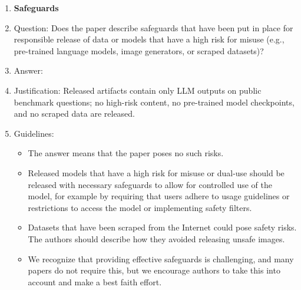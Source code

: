 \documentclass[11pt]{article}
\begin{document}
\begin{enumerate}
\item {\bf Safeguards}
    \item[] Question: Does the paper describe safeguards that have been put in place for responsible release of data or models that have a high risk for misuse (e.g., pre-trained language models, image generators, or scraped datasets)?
    \item[] Answer: \answerNA{}
    \item[] Justification: Released artifacts contain only LLM outputs on public benchmark questions; no high-risk content, no pre-trained model checkpoints, and no scraped data are released.
    \item[] Guidelines:
    \begin{itemize}
        \item The answer \answerNA{} means that the paper poses no such risks.
        \item Released models that have a high risk for misuse or dual-use should be released with necessary safeguards to allow for controlled use of the model, for example by requiring that users adhere to usage guidelines or restrictions to access the model or implementing safety filters.
        \item Datasets that have been scraped from the Internet could pose safety risks. The authors should describe how they avoided releasing unsafe images.
        \item We recognize that providing effective safeguards is challenging, and many papers do not require this, but we encourage authors to take this into account and make a best faith effort.
    \end{itemize}


\end{enumerate}
\end{document}
